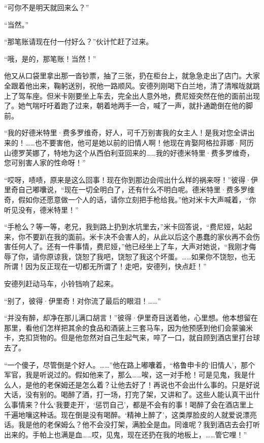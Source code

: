 \par “可你不是明天就回来么？”
\par “当然。”
\par “那笔账请现在付一付好么？”伙计忙赶了过来。
\par “哦，是的，那笔账！当然！”
\par 他又从口袋里拿出那一沓钞票，抽了三张，扔在柜台上，就急急走出了店门。大家全跟着他出来，鞠躬送别，祝他一路顺风。安德列刚喝下白兰地，清了清喉咙就跳上了驾车座。但米卡刚要坐上车去，完全出人意外地，费尼娅突然在他的面前出现了。她气喘吁吁着跑了过来，朝着地两手一合，喊了一声，就扑通跪倒在他的脚前。
\par “我的好德米特里·费多罗维奇，好人，可千万别害我的女主人！是我对您全讲出来的！……也不要害他，他可是她以前的旧情人啊！他现在肯娶阿格拉菲娜·阿历山德罗芙娜了，特地为这个从西伯利亚回来的……我的好德米特里·费多罗维奇，您可别害人家的性命呀！”
\par “哎呀，啧啧，原来是这么回事！现在你到那边会闯出什么样的祸来呀！”彼得·伊里奇自己嘟囔说，“现在一切全明白了，还有什么不明白呢。德米特里·费多罗维奇，假如你还愿意做一个人的话，请你立刻把手枪给我。”他对米卡大声喊着，“你听见没有，德米特里！”
\par “手枪么？等一等，老兄，我到路上扔到水坑里去，”米卡回答说，“费尼娅，站起来，你不要趴在我的面前。米卡决不会害人的，从此以后这个愚蠢的家伙再不会伤害任何人了。还有一件事情，费尼娅，”他已经坐上了车，大声对她说，“我刚才侮辱了你，请你原谅我，饶恕了我吧，饶恕了我这个坏蛋。……如果你不饶恕，也无所谓！因为反正现在一切都无所谓了！走吧，安德列，快点赶！”
\par 安德列赶动马车，小铃铛响了起来。
\par “别了，彼得·伊里奇！对你流了最后的眼泪！……”
\par “并没有醉，却净在那儿满口胡言！”彼得·伊里奇目送着他，心里想。他本想留在那里，看他们怎样把其余的食品和酒装上三套马车，因为他预感到他们会蒙骗米卡，克扣货物的。但是他忽然对自己生起气来，啐了一口，就自顾到酒店里打台球去了。
\par “一个傻子，尽管倒是个好人。……”他在路上嘟囔着，“格鲁申卡的‘旧情人’，那个军官，我是听说过的。假如他来了，那么……唉，这一对手枪！可是见鬼，我是什么人，是他的老保姆还是怎么着？让他去好了！再说也不会出什么事的。只是好说大话，没有别的。喝醉了酒，打一场，打完了架，又讲和了。这些人能认真干出什么事情来？什么‘我要走开’，‘惩罚自己’，都是不会有的事！喝醉了会在酒店里上千遍地嚷这种话。现在倒是没有喝醉。‘精神上醉了’，这类厚脸皮的人就爱说漂亮话。我是他的老保姆么？他不会没打架，满脸全是血。同谁呢？我到酒店去会打听出来的。手帕上也满是血……哎，见鬼，现在还扔在我的地板上，……管它哩！”
